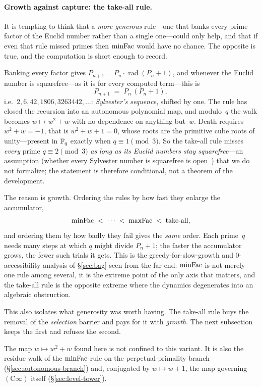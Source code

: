 \paragraph{Growth against capture: the take-all rule.}
It is tempting to think that a \emph{more generous} rule---one that
banks every prime factor of the Euclid number rather than a single
one---could only help, and that if even that rule missed primes then
$\mathrm{minFac}$ would have no chance.  The opposite is true, and the
computation is short enough to record.

Banking every factor gives
$P_{n+1} = P_n \cdot \operatorname{rad}(P_n+1)$, and whenever the
Euclid number is squarefree---as it is for every computed term---this
is
\[
  P_{n+1} \;=\; P_n\,(P_n+1),
\]
i.e.\ $2, 6, 42, 1806, 3263442, \dots$: \emph{Sylvester's sequence},
shifted by one.  The rule has closed the recursion into an autonomous
polynomial map, and modulo~$q$ the walk becomes
$w \mapsto w^2 + w$ with no dependence on anything but~$w$.  Death
requires $w^2 + w = -1$, that is $w^2+w+1 = 0$, whose roots are the
primitive cube roots of unity---present in $\mathbb{F}_q$ exactly when
$q \equiv 1 \pmod 3$.  So the take-all rule misses \emph{every} prime
$q \equiv 2 \pmod 3$ \emph{as long as its Euclid numbers stay
squarefree}---an assumption (whether every Sylvester number is squarefree
is open~\cite{Vardi1991}) that we do not formalize; the statement is
therefore conditional, not a theorem of the development.

The reason is growth.  Ordering the rules by how fast they enlarge the
accumulator,
\[
  \mathrm{minFac} \;<\; \cdots \;<\; \mathrm{maxFac} \;<\; \text{take-all},
\]
and ordering them by how badly they fail gives the \emph{same} order.
Each prime~$q$ needs many steps at which $q$ might divide $P_n+1$;
the faster the accumulator grows, the fewer such trials it gets.  This
is the greedy-for-slow-growth and $0$-accessibility analysis of
\S\ref{sec:bag} seen from the far end: $\mathrm{minFac}$ is not merely one rule
among several, it is the extreme point of the only axis that matters,
and the take-all rule is the opposite extreme where the dynamics
degenerates into an algebraic obstruction.

\smallskip\noindent
This also isolates what generosity was worth having.  The take-all rule
buys the removal of the \emph{selection} barrier and pays for it with
\emph{growth}.  The next subsection keeps the first and refuses the
second.

\smallskip\noindent
The map $w \mapsto w^2+w$ found here is not confined to this variant.  It is
also the residue walk of the $\mathrm{minFac}$ rule on the perpetual-primality
branch (\S\ref{sec:autonomous-branch}) and, conjugated by $w \mapsto w+1$,
the map governing $(\mathrm{C}\infty)$ itself (\S\ref{sec:level-tower}).

